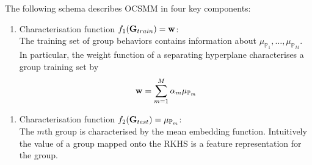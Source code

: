 The following schema describes OCSMM in four key components:   
 \begin{enumerate}[1.]
\item Characterisation function $f_1({\bf G}_{train})={\bf w}$: \\ The training set of group behaviors contains information about  $\mu_{\mathbb{P}_1},\dots, \mu_{\mathbb{P}_M}$.  In particular, the weight function of a separating hyperplane characterises a group training set by
\[{\bf w}= \sum_{m=1}^M \alpha_m  \mu_{\mathbb{P}_m}\] 
 \end{enumerate}
 \begin{enumerate}[2.]
 \item Characterisation function $f_2({\bf G}_{test})=\mu_{\mathbb{P}_m}$: \\ 
The $m$th group is characterised by the mean embedding function.  Intuitively the value of a group mapped onto the RKHS is a feature representation for the  group. 
\end{enumerate}
